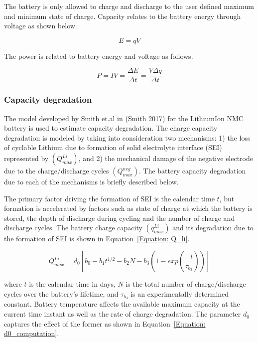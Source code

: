 The battery is only allowed to charge and discharge to the user defined maximum and minimum state of charge. Capacity relates to the battery energy through voltage as shown below.

\begin{equation}
E = q{V}
\label{Equation: energy_nmc}
\end{equation}

The power is related to battery energy and voltage as follows.

\begin{equation}
P = IV = \frac{\Delta E}{\Delta t} = \frac{V \Delta q}{\Delta t}
\label{Equation: power_nmc}
\end{equation}

\subsubsection{Capacity degradation}
The  model  developed by Smith et.al in (Smith 2017) for the LithiumIon NMC battery is used to estimate capacity degradation.
The charge capacity degradation is modeled by taking into consideration two mechanisms: 1) the loss of cyclable Lithium due to formation of solid electrolyte interface (SEI) represented by $(Q_{max}^{Li})$, and 2) the mechanical damage of the negative electrode due to the charge/discharge cycles $(Q_{max}^{neg})$. The battery capacity degradation due to each of the mechanisms is briefly described below.

The primary factor driving the formation of SEI is the calendar time $t$, but formation is accelerated by factors such as state of charge at which the battery is stored, the depth of discharge during cycling and the number of charge and discharge cycles. The battery charge capacity $(q_{max}^{Li})$ and its degradation due to the formation of SEI is shown in Equation~\ref{Equation: Q_li}.

\begin{equation}
Q_{max}^{Li} = d_0 \left[b_0 - b_1t^{1/2} - b_2N - b_3\left(1-exp (\frac{-t}{\tau_{b_3}})\right)\right]
\label{Equation: Q_li}
\end{equation}

where $t$ is the calendar time in days, $N$ is the total number of charge/discharge cycles over the battery's lifetime, and $\tau_{b_3}$ is an experimentally determined constant. Battery temperature affects the available maximum capacity at the current time instant as well as the rate of charge degradation. The parameter $d_0$ captures the effect of the former as shown in Equation~\ref{Equation: d0_computation}.

